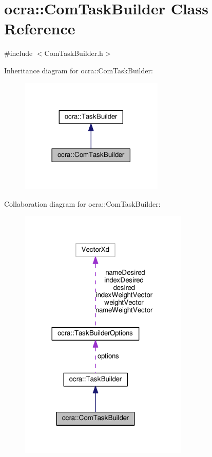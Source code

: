 \hypertarget{classocra_1_1ComTaskBuilder}{}\section{ocra\+:\+:Com\+Task\+Builder Class Reference}
\label{classocra_1_1ComTaskBuilder}


{\ttfamily \#include $<$Com\+Task\+Builder.\+h$>$}



Inheritance diagram for ocra\+:\+:Com\+Task\+Builder\+:
\nopagebreak
\begin{figure}[H]
\begin{center}
\leavevmode
\includegraphics[width=194pt]{d9/dcf/classocra_1_1ComTaskBuilder__inherit__graph}
\end{center}
\end{figure}


Collaboration diagram for ocra\+:\+:Com\+Task\+Builder\+:
\nopagebreak
\begin{figure}[H]
\begin{center}
\leavevmode
\includegraphics[width=228pt]{df/d8d/classocra_1_1ComTaskBuilder__coll__graph}
\end{center}
\end{figure}
